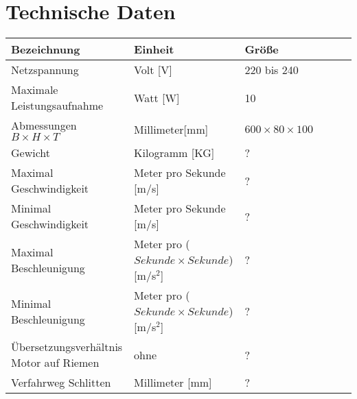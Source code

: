 %
%

\chapter{Technische Daten}
	\fontsize{8}{10}\selectfont
\begin{tabularx}{\textwidth}{|X|X|X|X|p{1cm}|X|}
	\hline 
	\textbf{Bezeichnung} & \textbf{Einheit} & \textbf{Größe} \\ \hline
	Netzspannung & Volt [V] & 220 bis 240  \\
	\hline
	Maximale Leistungsaufnahme & Watt [W] & 10  \\
	\hline
    Abmessungen $B \times H \times T$ & Millimeter[mm] & $600 \times 80 \times 100$ \\
    \hline
    Gewicht & Kilogramm [KG] & ? \\
    \hline 
    Maximal Geschwindigkeit & Meter pro Sekunde [m/s] & ?\\
    \hline	
    Minimal Geschwindigkeit & Meter pro Sekunde [m/s] & ?\\
    \hline
    Maximal Beschleunigung & Meter pro ($Sekunde \times Sekunde$) [m/s$^{2}$] & ? \\
    \hline
    Minimal Beschleunigung & Meter pro ($Sekunde \times Sekunde$) [m/s$^{2}$] & ? \\
    \hline
    Übersetzungsverhältnis Motor auf Riemen & ohne & ?\\
    \hline
    Verfahrweg Schlitten & Millimeter [mm] & ? \\
    \hline
    \end{tabularx}






